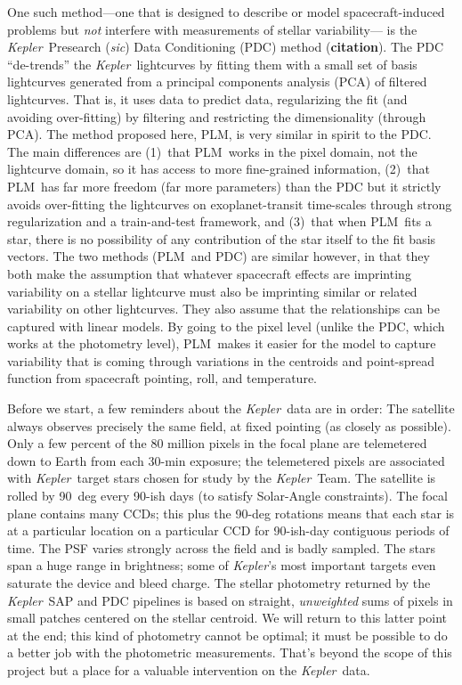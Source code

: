 \documentclass[12pt, preprint]{aastex}
\newcommand{\notenglish}[1]{\textit{#1}}
\newcommand{\sic}{\notenglish{sic}}
\newcommand{\project}[1]{\textsl{#1}}
\newcommand{\Kepler}{\project{Kepler}}
\newcommand{\name}{PLM}
\newcommand{\todo}[1]{\textbf{#1}}
\begin{document}
One such method---one that is designed to describe or model spacecraft-induced problems
  but \emph{not} interfere with measurements of stellar variability---%
  is the \Kepler\ Presearch (\sic) Data Conditioning (PDC) method (\todo{citation}).
The PDC ``de-trends'' the \Kepler\ lightcurves by fitting them with a small set of basis lightcurves
  generated from a principal components analysis (PCA) of filtered lightcurves.
That is, it uses data to predict data,
  regularizing the fit (and avoiding over-fitting) by filtering and restricting the dimensionality (through PCA).
The method proposed here, \name, is very similar in spirit to the PDC.
The main differences are
  (1)~that \name\ works in the pixel domain, not the lightcurve domain, so it has access to more fine-grained information,
  (2)~that \name\ has far more freedom (far more parameters) than the PDC
  but it strictly avoids over-fitting the lightcurves on exoplanet-transit time-scales
  through strong regularization and a train-and-test framework, and
  (3)~that when \name\ fits a star, there is no possibility of any contribution of the star itself to the fit basis vectors.
The two methods (\name\ and PDC) are similar however,
  in that they both make the assumption that whatever spacecraft effects are imprinting variability on a stellar lightcurve
  must also be imprinting similar or related variability on other lightcurves.
They also assume that the relationships can be captured with linear models.
By going to the pixel level (unlike the PDC, which works at the photometry level),
  \name\ makes it easier for the model to capture variability
  that is coming through variations in the centroids and point-spread function
  from spacecraft pointing, roll, and temperature.

Before we start, a few reminders about the \Kepler\ data are in order:
The satellite always observes precisely the same field, at fixed pointing (as closely as possible).
Only a few percent of the 80 million pixels in the focal plane are telemetered down
  to Earth from each 30-min exposure;
  the telemetered pixels are associated with \Kepler\ target stars chosen for study by the \Kepler\ Team.
The satellite is rolled by 90~deg every 90-ish days (to satisfy Solar-Angle constraints).
The focal plane contains many CCDs;
  this plus the 90-deg rotations means that each star is at a particular location
  on a particular CCD for 90-ish-day contiguous periods of time.
The PSF varies strongly across the field and is badly sampled.
The stars span a huge range in brightness;
  some of \Kepler's most important targets even saturate the device and bleed charge.
The stellar photometry returned by the \Kepler\ SAP and PDC pipelines is based on
  straight, \emph{unweighted} sums of pixels in small patches centered on the stellar centroid.
We will return to this latter point at the end;
  this kind of photometry cannot be optimal;
  it must be possible to do a better job with the photometric measurements.
That's beyond the scope of this project but a place for a valuable intervention on the \Kepler\ data.
\end{document}
